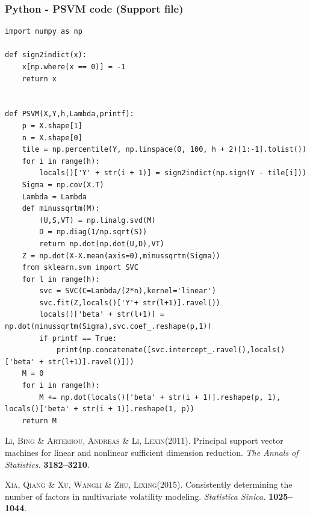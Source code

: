 \documentclass[11pt]{scrartcl} %
\begin{document}
\subsubsection{Python - PSVM code (Support file)}
\begin{lstlisting}
import numpy as np

def sign2indict(x):
    x[np.where(x == 0)] = -1
    return x


def PSVM(X,Y,h,Lambda,printf):
    p = X.shape[1]
    n = X.shape[0]
    tile = np.percentile(Y, np.linspace(0, 100, h + 2)[1:-1].tolist())
    for i in range(h):
        locals()['Y' + str(i + 1)] = sign2indict(np.sign(Y - tile[i]))
    Sigma = np.cov(X.T)
    Lambda = Lambda
    def minussqrtm(M):
        (U,S,VT) = np.linalg.svd(M)
        D = np.diag(1/np.sqrt(S))
        return np.dot(np.dot(U,D),VT)
    Z = np.dot(X-X.mean(axis=0),minussqrtm(Sigma))
    from sklearn.svm import SVC
    for l in range(h):
        svc = SVC(C=Lambda/(2*n),kernel='linear')
        svc.fit(Z,locals()['Y'+ str(l+1)].ravel())
        locals()['beta' + str(l+1)] = np.dot(minussqrtm(Sigma),svc.coef_.reshape(p,1))
        if printf == True:
            print(np.concatenate([svc.intercept_.ravel(),locals()['beta' + str(l+1)].ravel()]))
    M = 0
    for i in range(h):
        M += np.dot(locals()['beta' + str(i + 1)].reshape(p, 1), locals()['beta' + str(i + 1)].reshape(1, p))
    return M
\end{lstlisting}

\begin{thebibliography}{}

\textsc{Li, Bing} \& \textsc{Artemiou, Andreas} \& \textsc{Li, Lexin}(2011).
\newblock Principal support vector machines for linear and nonlinear sufficient dimension reduction.
\newblock \textit{The Annals of Statistics.}
\textbf{3182--3210}.

\textsc{Xia, Qiang} \& \textsc{Xu, Wangli} \& \textsc{Zhu, Lixing}(2015).
\newblock Consistently determining the number of factors in multivariate volatility modeling.
\newblock \textit{Statistica Sinica.}
\textbf{1025--1044}.


\end{thebibliography}


\end{document}
